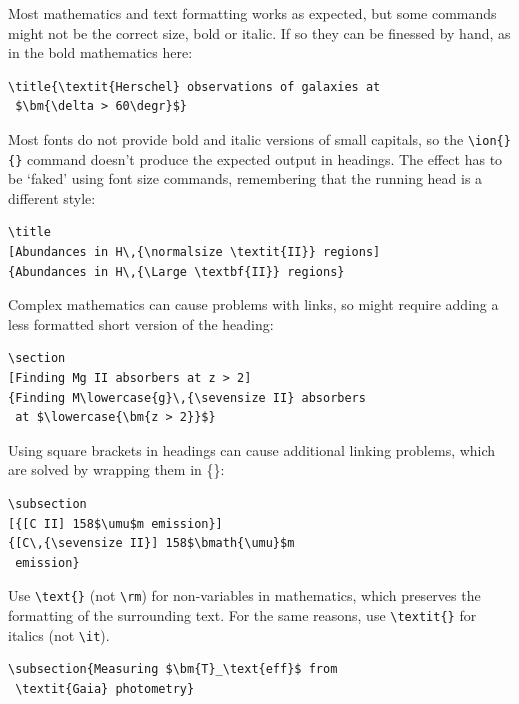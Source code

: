 \documentclass[a4paper,fleqn,usenatbib,useAMS]{mnras}
\begin{document}
Most mathematics and text formatting works as expected, but some commands might not be the correct size, bold or italic.
If so they can be finessed by hand, as in the bold mathematics here:
\begin{verbatim}
\title{\textit{Herschel} observations of galaxies at
 $\bm{\delta > 60\degr}$}
\end{verbatim}

Most fonts do not provide bold and italic versions of small capitals, so the \verb'\ion{}{}' command doesn't produce the expected output in headings.
The effect has to be `faked' using font size commands, remembering that the running head is a different style:
\begin{verbatim}
\title
[Abundances in H\,{\normalsize \textit{II}} regions]
{Abundances in H\,{\Large \textbf{II}} regions}
\end{verbatim}

Complex mathematics can cause problems with links, so might require adding a less formatted short version of the heading:
\begin{verbatim}
\section
[Finding Mg II absorbers at z > 2]
{Finding M\lowercase{g}\,{\sevensize II} absorbers
 at $\lowercase{\bm{z > 2}}$}
\end{verbatim}


Using square brackets in headings can cause additional linking problems, which are solved by wrapping them in \{\textellipsis\}:
\begin{verbatim}
\subsection
[{[C II] 158$\umu$m emission}]
{[C\,{\sevensize II}] 158$\bmath{\umu}$m
 emission}
\end{verbatim}

Use \verb'\text{}' (not \verb'\rm') for non-variables in mathematics, which preserves the formatting of the surrounding text.
For the same reasons, use \verb'\textit{}' for italics (not \verb'\it').
\begin{verbatim}
\subsection{Measuring $\bm{T}_\text{eff}$ from
 \textit{Gaia} photometry}
\end{verbatim}
\end{document}
